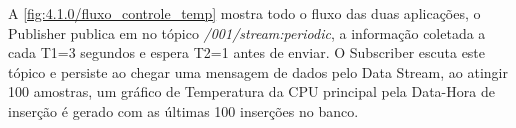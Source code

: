 A \ref{fig:4.1.0/fluxo_controle_temp} mostra todo o fluxo das duas aplicações, o Publisher publica em no tópico \textit{/001/stream:periodic}, a informação coletada a cada T1=3 segundos e espera T2=1 antes de enviar. O Subscriber escuta este tópico e persiste ao chegar uma mensagem de dados pelo Data Stream, ao atingir 100 amostras, um gráfico de Temperatura da CPU principal pela Data-Hora de inserção é gerado com as últimas 100 inserções no banco.







